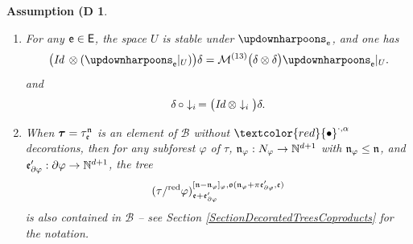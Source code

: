 \documentclass[10pt, reqno]{amsart}
\numberwithin{subsection}{section}
\numberwithin{subsubsection}{subsection}
\numberwithin{equation}{section} %
\theoremstyle{mystyle}
\theoremstyle{mystyle2}
\theoremstyle{mystyle3}
\newtheorem{assumD}{Assumption (D}
\newcommand{\bstau}{\boldsymbol{\tau}}
\newcommand\bbN{\mathbb{N}}
\newcommand{\mcB}{\mathcal{B}}
\newcommand{\mcM}{\mathcal{M}}
\begin{document}
\medskip

\begin{assumD}\label{D3}
\begin{enumerate}
\setlength{\itemsep}{0.5cm}
	\item For any ${\sf e}\in {\sf E}$, the space $U$ is stable under $\updownharpoons_{\sf 
e}$,
and one has
\begin{equation}   \label{EqCompatibilityConditionPreLiRenorm}
\big(\textrm{\emph{Id}}\,\otimes ({\updownharpoons_{\sf e}}\vert_U)\big)\delta 
= \mcM^{(13)}\big(\delta\otimes \delta\big){\updownharpoons_{\sf e}}\vert_U. 
\end{equation}
and
\begin{equation}   \label{EqCompatibilityConditionPreLiRenorm2}
\delta\, \circ \downarrow_i\, =\big(\textrm{\emph{Id}}\, \otimes\downarrow_i\big)\delta.
\end{equation}
	\item When $\bstau=\tau_{\frak{e}}^{\frak{n}}$ is an element of $\mcB$ without $\textcolor{red}{\bullet}^{\cdot,\alpha}$ decorations, then for any subforest $\varphi$ of $\tau$, $\frak{n}_\varphi:N_\varphi\to\bbN^{d+1}$ with $\frak{n}_\varphi\le\frak{n}$, and $\frak{e}_{\partial\varphi}':\partial\varphi\to\bbN^{d+1}$, the tree
\begin{equation}\label{D3:contraction}
(\tau/^{\text{\rm red}}\varphi)_{\frak{e}+\frak{e}_{\partial\varphi}'}^{[\frak{n}-\frak{n}_\varphi]_\varphi,\frak{o}(\frak{n}_\varphi+\pi\frak{e}_{\partial\varphi}',\frak{e})}
\end{equation}
is also contained in $\mcB$ -- see Section \ref{SectionDecoratedTreesCoproducts} for the notation.
\end{enumerate}
\end{assumD}

\medskip
\end{document}
